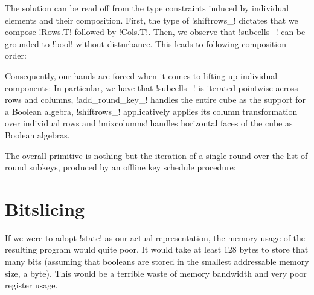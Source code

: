 \documentclass[draft,english]{jflart}
\begin{document}

The solution can be read off from the type constraints induced by
individual elements and their composition. First, the type of
\coqe!shiftrows_! dictates that we compose \coqe!Rows.T! followed by
\coqe!Cols.T!. Then, we observe that \coqe!subcells_! can be grounded
to \coqe!bool! without disturbance. This leads to following 
composition order:
%


Consequently, our hands are forced when it comes to lifting up
individual components:
%
%
In particular, we have that \coqe!subcells_! is iterated pointwise
across rows and columns, \coqe!add_round_key_! handles the entire cube
as the support for a Boolean algebra, \coqe!shiftrows_! applicatively
applies its column transformation over individual rows and
\coqe!mixcolumns! handles horizontal faces of the cube as Boolean
algebras.


The overall primitive is nothing but the iteration of a single round
over the list of round subkeys, produced by an offline key schedule
procedure:
%

\section{Bitslicing}
\label{sec:bitslicing}


If we were to adopt \coqe!state! as our actual representation, the
memory usage of the resulting program would quite poor. It would take
at least 128 bytes to store that many bits (assuming that booleans are
stored in the smallest addressable memory size, a byte). This would be
a terrible waste of memory bandwidth and very poor register usage.

\end{document}
